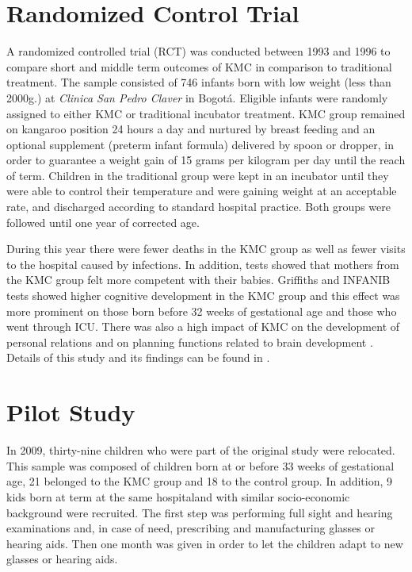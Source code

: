 \section{Randomized Control Trial}

A randomized controlled trial (RCT) was conducted between 1993 and 1996 to compare short and middle term outcomes of KMC in comparison to traditional treatment. The sample consisted of 746 infants born with low weight (less than 2000g.) at \emph{Clinica San Pedro Claver} in Bogotá. Eligible infants were randomly assigned to either KMC or traditional incubator treatment. KMC group remained on kangaroo position 24 hours a day and nurtured by breast feeding and an optional supplement (preterm infant formula) delivered by spoon or dropper, in order to guarantee a weight gain of 15 grams per kilogram per day until the reach of term. Children in the traditional group were kept in an incubator until they were able to control their temperature and were gaining weight at an acceptable rate, and discharged according to standard hospital practice. Both groups were followed until one year of corrected age. 

During this year there were fewer deaths in the KMC group as well as fewer visits to the hospital caused by infections. In addition, tests showed that mothers from the KMC group felt more competent with their babies. Griffiths and INFANIB tests showed higher cognitive development in the KMC group and this effect was more prominent on those born before 32 weeks of gestational age and those who went through ICU. There was also a high impact of KMC on the development of personal relations and on planning functions related to brain development \autocite{tessier_kangaroo_2003}. Details of this study and its findings can be found in \autocite{charpak_current_1996,charpak_kangaroo_1997,charpak_randomized_2001,charpak_kangaroo_2005}.



\section{Pilot Study}


In 2009, thirty-nine children who were part of the original study were relocated. This sample was composed of children born at or before 33 weeks of gestational age, 21 belonged to the KMC group and 18 to the control group. In addition, 9 kids born at term at the same hospitaland with similar socio-economic background were recruited. 
The first step was performing full sight and hearing examinations and, in case of need, prescribing and manufacturing glasses or hearing aids. Then one month was given in order to let the children adapt to new glasses or hearing aids. 


